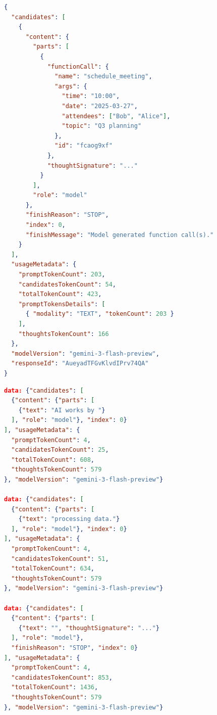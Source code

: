\begin{lstlisting}[language=json, caption={Resposta da API do \textbf{Gemini} (chamada de ferramenta)}]
{
  "candidates": [
    {
      "content": {
        "parts": [
          {
            "functionCall": {
              "name": "schedule_meeting",
              "args": {
                "time": "10:00",
                "date": "2025-03-27",
                "attendees": ["Bob", "Alice"],
                "topic": "Q3 planning"
              },
              "id": "fcaog9xf"
            },
            "thoughtSignature": "..."
          }
        ],
        "role": "model"
      },
      "finishReason": "STOP",
      "index": 0,
      "finishMessage": "Model generated function call(s)."
    }
  ],
  "usageMetadata": {
    "promptTokenCount": 203,
    "candidatesTokenCount": 54,
    "totalTokenCount": 423,
    "promptTokensDetails": [
      { "modality": "TEXT", "tokenCount": 203 }
    ],
    "thoughtsTokenCount": 166
  },
  "modelVersion": "gemini-3-flash-preview",
  "responseId": "AueyadTFGvKlvdIPrv74QA"
}
\end{lstlisting}

\begin{lstlisting}[language=json, caption={Resposta \textit{stream} do \textbf{Gemini} (padrão \textbf{SSE})}]
data: {"candidates": [
  {"content": {"parts": [
    {"text": "AI works by "}
  ], "role": "model"}, "index": 0}
], "usageMetadata": {
  "promptTokenCount": 4,
  "candidatesTokenCount": 25,
  "totalTokenCount": 608,
  "thoughtsTokenCount": 579
}, "modelVersion": "gemini-3-flash-preview"}

data: {"candidates": [
  {"content": {"parts": [
    {"text": "processing data."}
  ], "role": "model"}, "index": 0}
], "usageMetadata": {
  "promptTokenCount": 4,
  "candidatesTokenCount": 51,
  "totalTokenCount": 634,
  "thoughtsTokenCount": 579
}, "modelVersion": "gemini-3-flash-preview"}

data: {"candidates": [
  {"content": {"parts": [
    {"text": "", "thoughtSignature": "..."}
  ], "role": "model"},
  "finishReason": "STOP", "index": 0}
], "usageMetadata": {
  "promptTokenCount": 4,
  "candidatesTokenCount": 853,
  "totalTokenCount": 1436,
  "thoughtsTokenCount": 579
}, "modelVersion": "gemini-3-flash-preview"}
\end{lstlisting}
